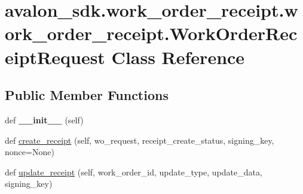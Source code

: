 \hypertarget{classavalon__sdk_1_1work__order__receipt_1_1work__order__receipt_1_1WorkOrderReceiptRequest}{}\section{avalon\+\_\+sdk.\+work\+\_\+order\+\_\+receipt.\+work\+\_\+order\+\_\+receipt.\+Work\+Order\+Receipt\+Request Class Reference}
\label{classavalon__sdk_1_1work__order__receipt_1_1work__order__receipt_1_1WorkOrderReceiptRequest}
\subsection*{Public Member Functions}
\begin{DoxyCompactItemize}
\item 
\mbox{\label{classavalon__sdk_1_1work__order__receipt_1_1work__order__receipt_1_1WorkOrderReceiptRequest_a09a9e42a3c65192aa67667e5eb17bc42}} 
def {\bfseries \+\_\+\+\_\+init\+\_\+\+\_\+} (self)
\item 
def \hyperlink{classavalon__sdk_1_1work__order__receipt_1_1work__order__receipt_1_1WorkOrderReceiptRequest_a5fe9d5a3392acb692d857fccf1621b0f}{create\+\_\+receipt} (self, wo\+\_\+request, receipt\+\_\+create\+\_\+status, signing\+\_\+key, nonce=None)
\item 
def \hyperlink{classavalon__sdk_1_1work__order__receipt_1_1work__order__receipt_1_1WorkOrderReceiptRequest_a4dfaccb4caa8145a291d9c8d2bc33b34}{update\+\_\+receipt} (self, work\+\_\+order\+\_\+id, update\+\_\+type, update\+\_\+data, signing\+\_\+key)
\end{DoxyCompactItemize}
